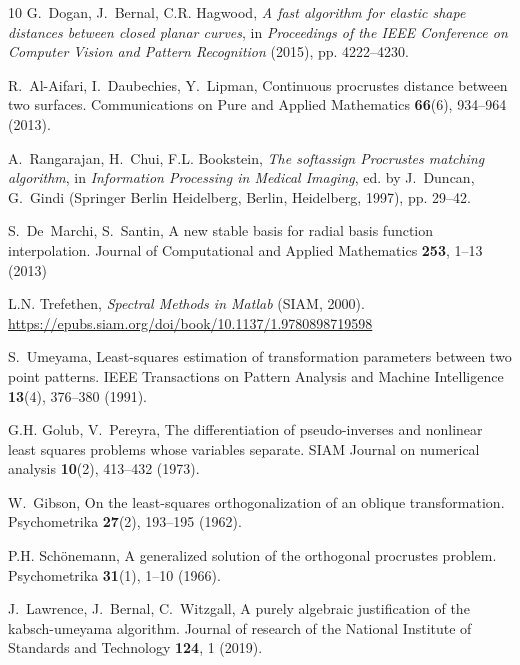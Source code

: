 \documentclass[pdflatex,iicol]{sn-jnl}%
\theoremstyle{thmstyleone}%
\theoremstyle{thmstyletwo}%
\theoremstyle{thmstylethree}%
\begin{document}
\begin{thebibliography}{10}
G.~Dogan, J.~Bernal, C.R. Hagwood, \emph{A fast algorithm for elastic shape distances between closed planar curves}, in \emph{Proceedings of the IEEE Conference on Computer Vision and Pattern Recognition} (2015), pp. 4222--4230.
\newblock {}

R.~Al-Aifari, I.~Daubechies, Y.~Lipman, Continuous procrustes distance between two surfaces.
\newblock Communications on Pure and Applied Mathematics \textbf{66}(6), 934--964 (2013).
\newblock {}

A.~Rangarajan, H.~Chui, F.L. Bookstein, \emph{The softassign Procrustes matching algorithm}, in \emph{Information Processing in Medical Imaging}, ed. by J.~Duncan, G.~Gindi (Springer Berlin Heidelberg, Berlin, Heidelberg, 1997), pp. 29--42.
\newblock {}

S.~De~{M}archi, S.~Santin, A new stable basis for radial basis function interpolation.
\newblock Journal of Computational and Applied Mathematics \textbf{253}, 1--13 (2013)

L.N. Trefethen, \emph{Spectral {M}ethods in {M}atlab} (SIAM, 2000).
\newblock \urlprefix\url{https://epubs.siam.org/doi/book/10.1137/1.9780898719598}

S.~Umeyama, Least-squares estimation of transformation parameters between two point patterns.
\newblock IEEE Transactions on Pattern Analysis and Machine Intelligence \textbf{13}(4), 376--380 (1991).
\newblock {}

G.H. Golub, V.~Pereyra, The differentiation of pseudo-inverses and nonlinear least squares problems whose variables separate.
\newblock SIAM Journal on numerical analysis \textbf{10}(2), 413--432 (1973).
\newblock {}

W.~Gibson, On the least-squares orthogonalization of an oblique transformation.
\newblock Psychometrika \textbf{27}(2), 193--195 (1962).
\newblock {}

P.H. Sch{\"o}nemann, A generalized solution of the orthogonal procrustes problem.
\newblock Psychometrika \textbf{31}(1), 1--10 (1966).
\newblock {}

J.~Lawrence, J.~Bernal, C.~Witzgall, A purely algebraic justification of the kabsch-umeyama algorithm.
\newblock Journal of research of the National Institute of Standards and Technology \textbf{124}, 1 (2019).
\newblock {}


\end{thebibliography}
\end{document}
